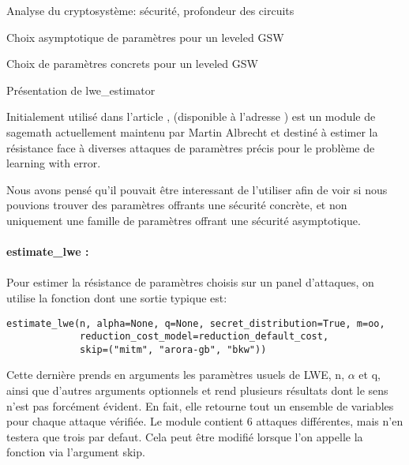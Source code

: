 \begin{section}{Analyse du cryptosystème: sécurité, profondeur des circuits}
\begin{subsection}{Choix asymptotique de paramètres pour un leveled GSW}
	\end{subsection}

	\begin{subsection}{Choix de paramètres concrets pour un leveled GSW}
	\begin{subsubsection}{Présentation de lwe\_estimator}
	
	Initialement utilisé dans l'article
	\cite{EPRINT:AlbPlaSco15},
	(disponible à l'adresse \cite{estimator}) est un module de sagemath actuellement maintenu par
Martin Albrecht et 
	destiné à estimer la résistance face à diverses attaques de paramètres précis pour
	le problème de learning with error.

	Nous avons pensé qu'il pouvait être interessant de l'utiliser afin de
	voir si nous pouvions trouver des paramètres offrants une sécurité
	concrète, et non uniquement une famille de paramètres offrant une
	sécurité asymptotique.
	
	
	\paragraph{}
	\textbf{estimate\_lwe :}

	\paragraph{}
	Pour estimer la résistance de paramètres choisis sur un panel
	d'attaques, on utilise la fonction  dont une sortie
	typique est:
	
	\flushleft
	
	\begin{lstlisting}
estimate_lwe(n, alpha=None, q=None, secret_distribution=True, m=oo,
             reduction_cost_model=reduction_default_cost,
             skip=("mitm", "arora-gb", "bkw"))
        \end{lstlisting}
	
	\flushleft
	
	Cette dernière prends en arguments les paramètres usuels de LWE, n, $\alpha$ et q, ainsi que
	d'autres arguments optionnels et rend plusieurs résultats dont le sens n'est pas forcément évident.
	En fait, elle retourne tout un ensemble de variables pour chaque attaque vérifiée. Le module
	contient 6 attaques différentes, mais n'en testera que trois par defaut. Cela peut être modifié
	lorsque l'on appelle la fonction  via l'argument skip.
	
	\flushleft
	

\end{subsubsection}
\end{subsection}
\end{section}
